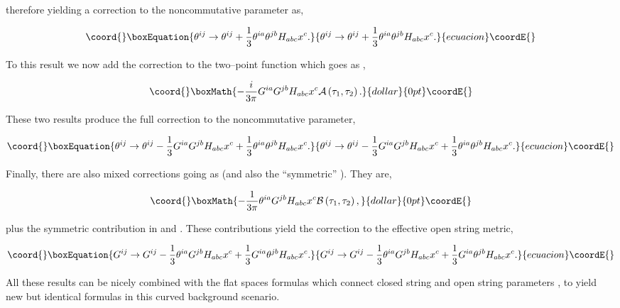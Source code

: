 \documentclass[a4paper,11pt]{article}
\begin{document}
\noindent
therefore yielding a correction to the noncommutative \myHighlight{$\theta$}\coordHE{}
parameter as,

\begin{equation}\coord{}\boxEquation{
\theta^{ij} \to \theta^{ij} + {\frac{1}{3}} \theta^{ia} \theta^{jb} H_{abc}
x^{c}.
}{
\theta^{ij} \to \theta^{ij} + {\frac{1}{3}} \theta^{ia} \theta^{jb} H_{abc}
x^{c}.
}{ecuacion}\coordE{}\end{equation}

\noindent 
To this result we now add the correction to the two--point function which
goes as \coordHE{},

$$\coord{}\boxMath{
- {\frac{i }{3\pi}} G^{ia} G^{jb} H_{abc} x^{c} \mathcal{A} \left( 
\tau_{1},\tau_{2} \right).
}{dollar}{0pt}\coordE{}$$

\noindent 
These two results produce the full correction to the noncommutative
parameter,

\begin{equation}\coord{}\boxEquation{  \label{correction-theta}
\theta^{ij} \to \theta^{ij} - {\frac{1}{3}} G^{ia} G^{jb} H_{abc} x^{c} + 
{\frac{1}{3}} \theta^{ia} \theta^{jb} H_{abc} x^{c}.
}{  \theta^{ij} \to \theta^{ij} - {\frac{1}{3}} G^{ia} G^{jb} H_{abc} x^{c} + 
{\frac{1}{3}} \theta^{ia} \theta^{jb} H_{abc} x^{c}.
}{ecuacion}\coordE{}\end{equation}

\noindent 
Finally, there are also mixed corrections going as \coordHE{} (and also the ``symmetric'' \coordHE{}). They are,

$$\coord{}\boxMath{
- {\frac{1 }{3\pi}} \theta^{ia} G^{jb} H_{abc} x^{c}
\mathcal{B} \left( \tau_{1},\tau_{2} \right),
}{dollar}{0pt}\coordE{}$$

\noindent
plus the symmetric contribution in \coordHE{} and \coordHE{}. These contributions yield
the correction to the effective open string metric,

\begin{equation}\coord{}\boxEquation{  \label{correction-metric}
G^{ij} \to G^{ij} - {\frac{1}{3}} \theta^{ia} G^{jb} H_{abc} x^{c} + 
{\frac{1}{3}} G^{ia} \theta^{jb} H_{abc} x^{c}.
}{  G^{ij} \to G^{ij} - {\frac{1}{3}} \theta^{ia} G^{jb} H_{abc} x^{c} + 
{\frac{1}{3}} G^{ia} \theta^{jb} H_{abc} x^{c}.
}{ecuacion}\coordE{}\end{equation}

\noindent
All these results can be nicely combined with the flat spaces formulas
which connect closed string and open string parameters \cite{Schomerus,
Seiberg-Witten}, to yield new but identical formulas in this curved
background scenario.
\end{document}
